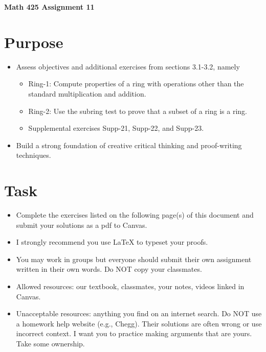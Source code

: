 \documentclass[12pt]{article}
\begin{document}
	\begin{center}
		{\Large \bf Math 425 Assignment 11}
	\end{center}
	\section*{Purpose}
	\begin{itemize}
		\item Assess objectives and additional exercises from sections 3.1-3.2, namely
		\begin{itemize} 
			\item Ring-1: Compute properties of a ring with operations other than the standard multiplication and addition.
			\item Ring-2: Use the subring test to prove that a subset of a ring is a ring.
			\item Supplemental exercises Supp-21, Supp-22, and Supp-23.
		\end{itemize}
		\item Build a strong foundation of creative critical thinking and proof-writing techniques.
	\end{itemize}
	\section*{Task}
	\begin{itemize}
		\item Complete the exercises listed on the following page(s) of this document and submit your solutions as a pdf to Canvas.
		\item I strongly recommend you use LaTeX to typeset your proofs.
		\item You may work in groups but everyone should submit their own assignment written in their own words.  Do NOT copy your classmates.
		\item Allowed resources: our textbook, classmates, your notes, videos linked in Canvas.
		\item Unacceptable resources: anything you find on an internet search. Do NOT use a homework help website (e.g., Chegg). Their solutions are often wrong or use incorrect context.  I want you to practice making arguments that are yours. Take some ownership.
	\end{itemize}
\end{document}
